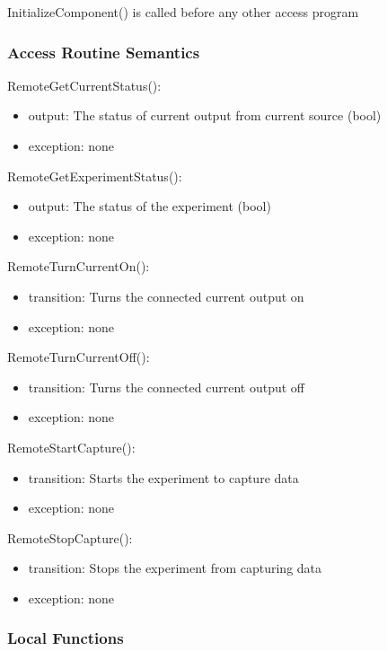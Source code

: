 \documentclass[12pt, titlepage]{article}
\begin{document}
InitializeComponent() is called before any other access program

\subsubsection{Access Routine Semantics}

\noindent RemoteGetCurrentStatus():
\begin{itemize}
\item output: The status of current output from current source (bool)
\item exception: none
\end{itemize}

\noindent RemoteGetExperimentStatus():
\begin{itemize}
\item output: The status of the experiment (bool)
\item exception: none
\end{itemize}

\noindent RemoteTurnCurrentOn():
\begin{itemize}
\item transition: Turns the connected current output on
\item exception: none
\end{itemize}

\noindent RemoteTurnCurrentOff():
\begin{itemize}
\item transition: Turns the connected current output off
\item exception: none
\end{itemize}

\noindent RemoteStartCapture():
\begin{itemize}
\item transition: Starts the experiment to capture data
\item exception: none
\end{itemize}

\noindent RemoteStopCapture():
\begin{itemize}
\item transition: Stops the experiment from capturing data
\item exception: none
\end{itemize}


\subsubsection{Local Functions}
\end{document}
